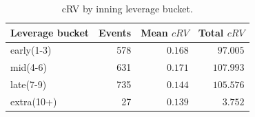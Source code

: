 \begin{table}[h]
\centering
\caption{cRV by inning leverage bucket.}
\label{tab:leverage}
\small
\begin{tabular}{lrrr}
\toprule
Leverage bucket & Events & Mean $cRV$ & Total $cRV$ \\
\midrule
early(1-3) & 578 & $0.168$ & $97.005$ \\
mid(4-6) & 631 & $0.171$ & $107.993$ \\
late(7-9) & 735 & $0.144$ & $105.576$ \\
extra(10+) & 27 & $0.139$ & $3.752$ \\
\bottomrule
\end{tabular}
\end{table}
